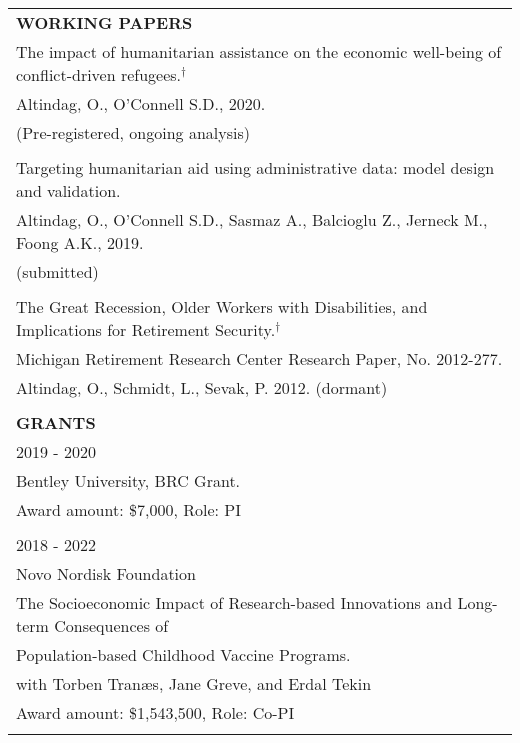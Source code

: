 \documentclass[12 pt]{article}
\begin{document}
\begin{longtable}{ccccc}
\\


\multicolumn{5}{l}{\textbf{WORKING PAPERS}}\\[2 pt]

 \multicolumn{5}{l}{The impact of humanitarian assistance on the economic well-being of conflict-driven refugees.$^{\dagger}$} \\
 \multicolumn{5}{l}{Altindag, O., O'Connell S.D., 2020.}  \\
  \multicolumn{5}{l}{(Pre-registered, ongoing analysis)}  \\

  \\

\multicolumn{5}{l}{Targeting humanitarian aid using administrative data: model design and validation.} \\ 
  \multicolumn{5}{l}{Altindag, O., O'Connell S.D., Sasmaz A., Balcioglu Z., Jerneck M., Foong A.K., 2019.} \\
\multicolumn{5}{l}{(submitted)} \\ 
 

  
\\






\multicolumn{5}{l}{The Great Recession, Older Workers with Disabilities, and Implications for Retirement Security.$^{\dagger}$} \\
\multicolumn{5}{l}{Michigan Retirement Research Center Research Paper, No. 2012-277.} \\
\multicolumn{5}{l}{Altindag, O., Schmidt, L., Sevak, P. 2012. (dormant) } \\
\\


  \multicolumn{5}{l}{\textbf{GRANTS}}\\[2 pt]
 \multicolumn{5}{l}{2019 - 2020} \\  
  \multicolumn{5}{l}{Bentley University, BRC Grant.} \\
\multicolumn{5}{l}{Award amount: \$7,000, Role: PI}  \\
\\  
 \multicolumn{5}{l}{2018 - 2022} \\
 \multicolumn{5}{l}{Novo Nordisk Foundation}  \\
\multicolumn{5}{l}{The Socioeconomic Impact of Research-based Innovations and Long-term Consequences of}  \\
  \multicolumn{5}{l}{Population-based Childhood Vaccine Programs.} \\
  \multicolumn{5}{l}{with Torben Tran{\ae}s, Jane Greve, and Erdal Tekin}  \\
  \multicolumn{5}{l}{Award amount: \$1,543,500, Role: Co-PI  }  \\
  \\


\end{longtable}
\end{document}
